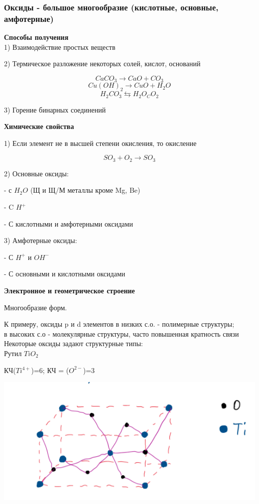 \subsubsection*{Оксиды - большое многообразие (кислотные, основные, амфотерные)}

\textbf{Способы получения}\\
1) Взаимодействие простых веществ

2) Термическое разложение некоторых солей, кислот, оснований

$$CaCO_3 \rightarrow CaO + CO_3$$
$$Cu(OH)_2 \rightarrow CuO + H_2O$$
$$H_2CO_3 \leftrightarrows H_2O _ CO_2$$

3) Горение бинарных соединений

\textbf{Химические свойства}

1) Если элемент не в высшей степени окисления, то окисление

$$SO_3 + O_2 \rightarrow SO_3$$

2) Основные оксиды:

- с $H_2O$ (Щ и Щ/М металлы кроме Mg, Be)

- C $H^+$

- С кислотными и амфотерными оксидами

3) Амфотерные оксиды:

- С $H^+$ и $OH^-$

- С основными и кислотными оксидами

\textbf{Электронное и геометрическое строение}

Многообразие форм.

К примеру, оксиды p и d элементов в низких с.о. - полимерные структуры;\\
в высоких с.о - молекулярные структуры, часто повышенная кратность связи\\
Некоторые оксиды задают структурные типы:\\
Рутил $TiO_2$

КЧ($Ti^{4+}$)=6; КЧ = ($O^{2-}$)=3

\includegraphics{images/6v6.png}

